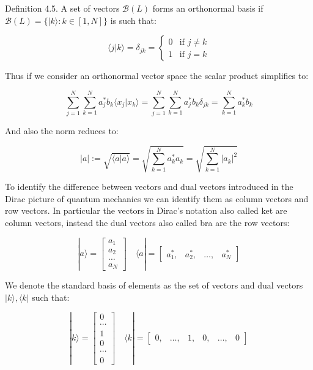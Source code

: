 Definition 4.5. A set of vectors $\mathcal{B}(L)$ forms an orthonormal basis if $\mathcal{B}(L) = \{|k\rangle: k \in [1,N]\}$ is such that:

\[
\langle j|k\rangle = \delta_{jk} = \begin{cases}
0 & \text{if } j \neq k \\
1 & \text{if } j = k
\end{cases}
\]

Thus if we consider an orthonormal vector space the scalar product simplifies to:

\begin{equation}
\sum_{j=1}^{N}\sum_{k=1}^{N} a_j^*b_k\langle x_j|x_k\rangle = \sum_{j=1}^{N}\sum_{k=1}^{N} a_j^*b_k\delta_{jk} = \sum_{k=1}^{N} a_k^*b_k
\end{equation}

And also the norm reduces to:

\begin{equation}
|a| := \sqrt{\langle a|a\rangle} = \sqrt{\sum_{k=1}^{N} a_k^*a_k} = \sqrt{\sum_{k=1}^{N}|a_k|^2}
\end{equation}

To identify the difference between vectors and dual vectors introduced in the Dirac picture of quantum mechanics we can identify them as column vectors and row vectors. In particular the vectors in Dirac's notation also called ket are column vectors, instead the dual vectors also called bra are the row vectors:

\[
|a\rangle = \begin{bmatrix}
a_1 \\
a_2 \\
\ldots \\
a_N
\end{bmatrix} \quad
\langle a| = \begin{bmatrix}
a_1^*, & a_2^*, & \ldots, & a_N^*
\end{bmatrix}
\]

We denote the standard basis of elements as the set of vectors and dual vectors $|k\rangle, \langle k|$ such that:

\[
|k\rangle = \begin{bmatrix}
0 \\
\cdots \\
1 \\
0 \\
\cdots \\
0
\end{bmatrix} \quad
\langle k| = \begin{bmatrix}
0, & \ldots, & 1, & 0, & \ldots, & 0
\end{bmatrix}
\]

